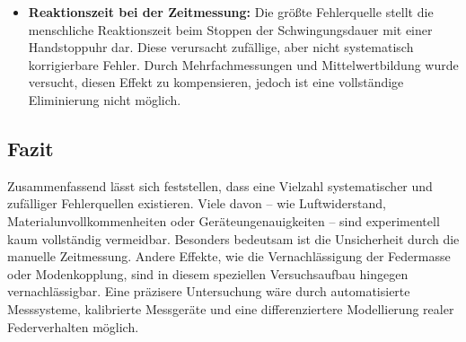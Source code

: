 \begin{itemize}
    \item \textbf{Reaktionszeit bei der Zeitmessung:} Die größte Fehlerquelle stellt die menschliche Reaktionszeit beim Stoppen der Schwingungsdauer mit einer Handstoppuhr dar. Diese verursacht zufällige, aber nicht systematisch korrigierbare Fehler. Durch Mehrfachmessungen und Mittelwertbildung wurde versucht, diesen Effekt zu kompensieren, jedoch ist eine vollständige Eliminierung nicht möglich.
\end{itemize}

\subsection*{Fazit}

Zusammenfassend lässt sich feststellen, dass eine Vielzahl systematischer und zufälliger Fehlerquellen existieren. Viele davon – wie Luftwiderstand, Materialunvollkommenheiten oder Geräteungenauigkeiten – sind experimentell kaum vollständig vermeidbar. Besonders bedeutsam ist die Unsicherheit durch die manuelle Zeitmessung. Andere Effekte, wie die Vernachlässigung der Federmasse oder Modenkopplung, sind in diesem speziellen Versuchsaufbau hingegen vernachlässigbar. Eine präzisere Untersuchung wäre durch automatisierte Messsysteme, kalibrierte Messgeräte und eine differenziertere Modellierung realer Federverhalten möglich.
